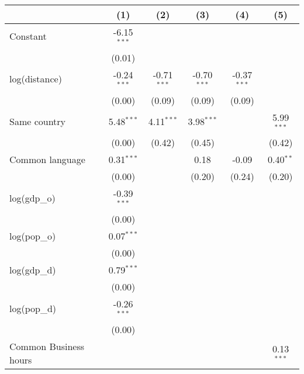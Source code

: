 
\begingroup
\centering
\small
\begin{tabular}{lccccc}
   \toprule
                            & (1)           & (2)           & (3)           & (4)           & (5)\\  
   \midrule 
   Constant                 & -6.15$^{***}$ &               &               &               &   \\   
                            & (0.01)        &               &               &               &   \\   
   log(distance)            & -0.24$^{***}$ & -0.71$^{***}$ & -0.70$^{***}$ & -0.37$^{***}$ &   \\   
                            & (0.00)        & (0.09)        & (0.09)        & (0.09)        &   \\   
   Same country             & 5.48$^{***}$  & 4.11$^{***}$  & 3.98$^{***}$  &               & 5.99$^{***}$\\   
                            & (0.00)        & (0.42)        & (0.45)        &               & (0.42)\\   
   Common language          & 0.31$^{***}$  &               & 0.18          & -0.09         & 0.40$^{**}$\\   
                            & (0.00)        &               & (0.20)        & (0.24)        & (0.20)\\   
   log(gdp\_o)              & -0.39$^{***}$ &               &               &               &   \\   
                            & (0.00)        &               &               &               &   \\   
   log(pop\_o)              & 0.07$^{***}$  &               &               &               &   \\   
                            & (0.00)        &               &               &               &   \\   
   log(gdp\_d)              & 0.79$^{***}$  &               &               &               &   \\   
                            & (0.00)        &               &               &               &   \\   
   log(pop\_d)              & -0.26$^{***}$ &               &               &               &   \\   
                            & (0.00)        &               &               &               &   \\   
   Common Business hours    &               &               &               &               & 0.13$^{***}$\\   

\end{tabular}
